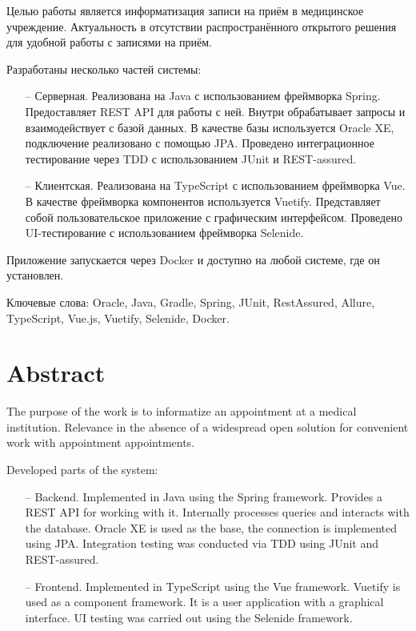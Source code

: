 \documentclass[a4paper,article]{article}
\begin{document}
\begin{sloppypar}
    Целью работы является информатизация записи на приём в медицинское учреждение. Актуальность в отсутствии распространённого открытого решения для удобной работы с записями на приём.

    Разработаны несколько частей системы:

    \begin{itemize}[nolistsep]
		\item[--] Серверная. Реализована на Java с использованием фреймворка Spring. Предоставляет REST API для работы с ней. Внутри обрабатывает запросы и взаимодействует с базой данных. В качестве базы используется Oracle XE, подключение реализовано с помощью JPA. Проведено интеграционное тестирование через TDD с использованием JUnit и REST-assured.
		\item[--] Клиентская. Реализована на TypeScript с использованием фреймворка Vue. В качестве фреймворка компонентов используется Vuetify. Представляет собой пользовательское приложение с графическим интерфейсом. Проведено UI-тестирование с использованием фреймворка Selenide.
	\end{itemize}

	Приложение запускается через Docker и доступно на любой системе, где он установлен.

	Ключевые слова: Oracle, Java, Gradle, Spring, JUnit, RestAssured, Allure, TypeScript, Vue.js, Vuetify, Selenide, Docker.


    \newpage

    \section*{Abstract}
    

    The purpose of the work is to informatize an appointment at a medical institution. Relevance in the absence of a widespread open solution for convenient work with appointment appointments.

    Developed parts of the system:

    \begin{itemize}[nolistsep]
        \item[--] Backend. Implemented in Java using the Spring framework. Provides a REST API for working with it. Internally processes queries and interacts with the database. Oracle XE is used as the base, the connection is implemented using JPA. Integration testing was conducted via TDD using JUnit and REST-assured.
        \item[--] Frontend. Implemented in TypeScript using the Vue framework. Vuetify is used as a component framework. It is a user application with a graphical interface. UI testing was carried out using the Selenide framework.
    \end{itemize}


\end{sloppypar}
\end{document}
